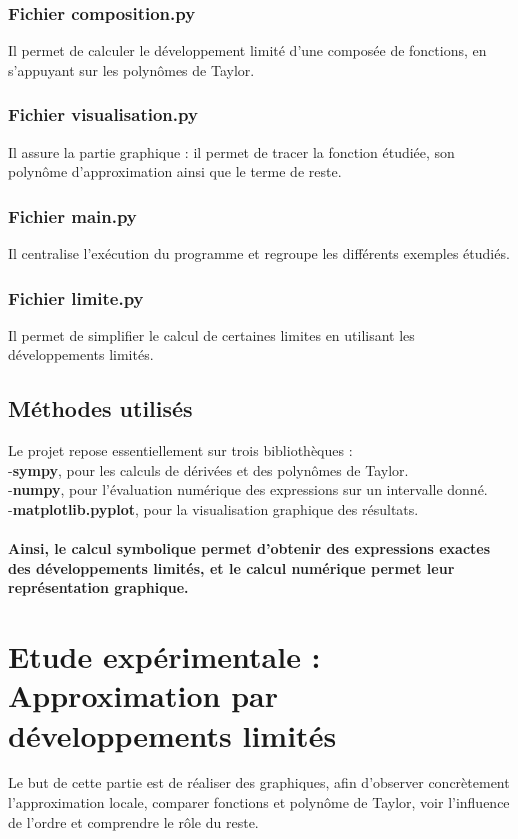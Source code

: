 \documentclass{article}
\begin{document}
\subsubsection{Fichier composition.py}
Il permet de calculer le développement limité d'une composée de fonctions, en s'appuyant sur les polynômes de Taylor.
\subsubsection{Fichier visualisation.py}
Il assure la partie graphique : il permet de tracer la fonction étudiée, son polynôme d’approximation ainsi que le terme de reste. 
\subsubsection{Fichier main.py} 
Il centralise l’exécution du programme et regroupe les différents exemples étudiés.
\subsubsection{Fichier limite.py}
Il permet de simplifier le calcul de certaines limites en utilisant les développements limités.


\subsection{Méthodes utilisés}

Le projet repose essentiellement sur trois bibliothèques : \\
-\textbf{sympy}, pour les calculs de dérivées et des polynômes de Taylor. \\
-\textbf{numpy}, pour l’évaluation numérique des expressions sur un intervalle donné.\\
-\textbf{matplotlib.pyplot}, pour la visualisation graphique des résultats. \\ \\
\textbf{Ainsi, le calcul symbolique permet d'obtenir des expressions exactes des développements limités, et le calcul numérique permet leur représentation graphique. }




\section{\textbf{Etude expérimentale : Approximation par développements limités}}
Le but de cette partie est de réaliser des graphiques, afin d'observer concrètement l'approximation locale, comparer fonctions et polynôme de Taylor, voir l'influence de l'ordre et comprendre le rôle du reste. 
\end{document}
